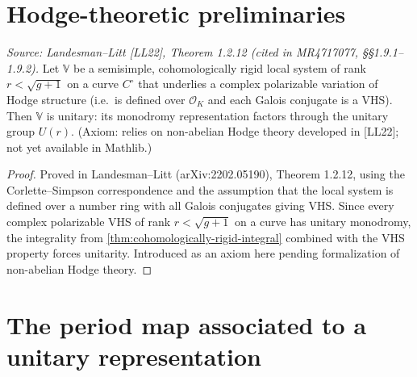 \section{Hodge-theoretic preliminaries}


\begin{theorem}
  \label{thm:nah-unitarity}
  \textit{Source: Landesman--Litt [LL22], Theorem 1.2.12 (cited in MR4717077, §§1.9.1–1.9.2).}
  Let $\mathbb{V}$ be a semisimple, cohomologically rigid local system of rank
  $r < \sqrt{g+1}$ on a curve $C^\circ$ that underlies a complex polarizable
  variation of Hodge structure (i.e.\ is defined over $\mathcal{O}_K$ and each
  Galois conjugate is a VHS).
  Then $\mathbb{V}$ is unitary: its monodromy representation factors through
  the unitary group $U(r)$.
  (Axiom: relies on non-abelian Hodge theory developed in [LL22]; not yet
  available in Mathlib.)
\end{theorem}

\begin{proof}
  Proved in Landesman--Litt (arXiv:2202.05190), Theorem 1.2.12, using the
  Corlette--Simpson correspondence and the assumption that the local system is
  defined over a number ring with all Galois conjugates giving VHS.
  Since every complex polarizable VHS of rank $r < \sqrt{g+1}$ on a curve has
  unitary monodromy, the integrality from \cref{thm:cohomologically-rigid-integral}
  combined with the VHS property forces unitarity.
  Introduced as an axiom here pending formalization of non-abelian Hodge theory.
\end{proof}

\section{The period map associated to a unitary representation}

